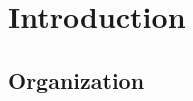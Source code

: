 \chapter{Introduction}
\label{ch:introduction}




\section{Organization}
\label{sec:intro:organization}